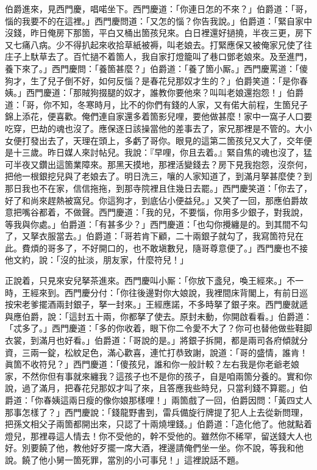 伯爵進來，見西門慶，唱喏坐下。西門慶道：「你連日怎的不來？」伯爵道：「哥，惱的我要不的在這裡。」西門慶問道：「又怎的惱？你告我說。」伯爵道：「緊自家中沒錢，昨日俺房下那箇，平白又桶出箇孩兒來。白日裡還好撾撓，半夜三更，房下又七痛八病。少不得扒起來收拾草紙被褥，叫老娘去。打緊應保又被俺家兄使了往庄子上馱草去了。百忙撾不着箇人，我自家打燈籠叫了巷口鄧老娘來。及至進門，養下來了。」西門慶問：「養箇甚麼？」伯爵道：「養了箇小厮。」西門慶罵道：「傻狗才，生了兒子倒不好，如何反惱？是春花兒那奴才生的？」伯爵笑道：「是你春姨。」西門慶道：「那賊狗掇腿的奴才，誰教你要他來？叫叫老娘還抱怨！」伯爵道：「哥，你不知，冬寒時月，比不的你們有錢的人家，又有偌大前程，生箇兒子錦上添花，便喜歡。俺們連自家還多着箇影兒哩，要他做甚麼！家中一窩子人口要吃穿，巴劫的魂也沒了。應保逐日該操當他的差事去了，家兄那裡是不管的。大小女便打發出去了，天理在頭上，多虧了哥你。{}眼見的這第二箇孩兒又大了，交年便是十三歲。昨日媒人來討帖兒。我說：『早哩，你且去着。』緊自焦的魂也沒了，猛可半夜又鑽出這箇業障來。那黑天摸地，那裡活變錢去？房下見我抱怨，沒奈何，把他一根銀挖兒與了老娘去了。{}明日洗三，嚷的人家知道了，到滿月拏甚麼使？到那日我也不在家，信信拖拖，到那寺院裡且住幾日去罷。」{}西門慶笑道：「你去了，好了和尚來趕熱被窩兒。你這狗才，到底佔小便益兒。」又笑了一回，那應伯爵故意把嘴谷都着，{}不做聲。{}西門慶道：「我的兒，不要惱，你用多少銀子，對我說，等我與你處。」伯爵道：「有甚多少？」西門慶道：「也勾你攪纏是的。到其間不勾了，又拏衣服當去。」伯爵道：「哥若肯下顧，二十兩銀子就勾了，我寫箇符兒在此。費煩的哥多了，不好開口的，也不敢塡數兒，隨哥尊意便了。」西門慶也不接他文約，說：「沒的扯淡，朋友家，什麼符兒！」

正說着，只見來安兒拏茶進來。西門慶叫小厮：「你放下盞兒，喚王經來。」不一時，王經來到。西門慶分付：「你往後邊對你大娘說，我裡間床背閣上，有前日巡按宋老爹擺酒兩封銀子，拏一封來。」王經應諾，不多時拏了銀子來。西門慶就遞與應伯爵，說：「這封五十兩，你都拏了使去。{}原封未動，你開啟看看。」伯爵道：「忒多了。」西門慶道：「多的你收着，眼下你二令愛不大了？你可也替他做些鞋脚衣裳，到滿月也好看。」伯爵道：「哥說的是。」將銀子拆開，都是兩司各府傾就分資，三兩一錠，松紋足色，滿心歡喜，連忙打恭致謝，說道：「哥的盛情，誰肯！眞箇不收符兒？」西門慶道：「傻孩兒，誰和你一般計較？左右我是你老爺老娘家，不然你但有事就來纏我？這孩子也不是你的孩子，自是咱兩箇分養的。實和你說，過了滿月，把春花兒那奴才叫了來，且答應我些時兒，只當利錢不算罷。」伯爵道：「你春姨這兩日瘦的像你娘那樣哩！」兩箇戲了一回，伯爵因問：「黃四丈人那事怎樣了？」西門慶說：「錢龍野書到，雷兵備旋行牌提了犯人上去從新問理，把孫文相父子兩箇都開出來，只認了十兩燒埋錢。」伯爵道：「造化他了。他就點着燈兒，那裡尋這人情去！你不受他的，幹不受他的。雖然你不稀罕，留送錢大人也好。別要饒了他，教他好歹擺一席大酒，裡邊請俺們坐一坐。你不說，等我和他說。饒了他小舅一箇死罪，當別的小可事兒！」這裡說話不題。

